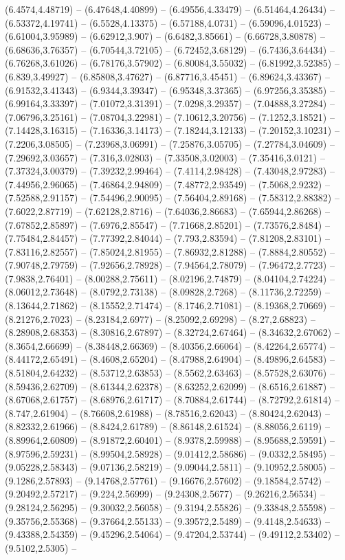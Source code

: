{(6.4574,4.48719) -- (6.47648,4.40899) -- (6.49556,4.33479) -- (6.51464,4.26434) -- (6.53372,4.19741) -- (6.5528,4.13375) -- (6.57188,4.0731) -- (6.59096,4.01523) -- (6.61004,3.95989) -- (6.62912,3.907) -- (6.6482,3.85661) -- (6.66728,3.80878) -- (6.68636,3.76357) -- (6.70544,3.72105) -- (6.72452,3.68129) -- (6.7436,3.64434) -- (6.76268,3.61026) -- (6.78176,3.57902) -- (6.80084,3.55032) -- (6.81992,3.52385) -- (6.839,3.49927) -- (6.85808,3.47627) -- (6.87716,3.45451) -- (6.89624,3.43367) -- (6.91532,3.41343) -- (6.9344,3.39347) -- (6.95348,3.37365) -- (6.97256,3.35385) -- (6.99164,3.33397) -- (7.01072,3.31391) -- (7.0298,3.29357) -- (7.04888,3.27284) -- (7.06796,3.25161) -- (7.08704,3.22981) -- (7.10612,3.20756) -- (7.1252,3.18521) -- (7.14428,3.16315) -- (7.16336,3.14173) -- (7.18244,3.12133) -- (7.20152,3.10231) -- (7.2206,3.08505) -- (7.23968,3.06991) -- (7.25876,3.05705) -- (7.27784,3.04609) -- (7.29692,3.03657) -- (7.316,3.02803) -- (7.33508,3.02003) -- (7.35416,3.0121) -- (7.37324,3.00379) -- (7.39232,2.99464) -- (7.4114,2.98428) -- (7.43048,2.97283) -- (7.44956,2.96065) -- (7.46864,2.94809) -- (7.48772,2.93549) -- (7.5068,2.9232) -- (7.52588,2.91157) -- (7.54496,2.90095) -- (7.56404,2.89168) -- (7.58312,2.88382) -- (7.6022,2.87719) -- (7.62128,2.8716) -- (7.64036,2.86683) -- (7.65944,2.86268) -- (7.67852,2.85897) -- (7.6976,2.85547) -- (7.71668,2.85201) -- (7.73576,2.8484) -- (7.75484,2.84457) -- (7.77392,2.84044) -- (7.793,2.83594) -- (7.81208,2.83101) -- (7.83116,2.82557) -- (7.85024,2.81955) -- (7.86932,2.81288) -- (7.8884,2.80552) -- (7.90748,2.79759) -- (7.92656,2.78928) -- (7.94564,2.78079) -- (7.96472,2.7723) -- (7.9838,2.76401) -- (8.00288,2.75611) -- (8.02196,2.74879) -- (8.04104,2.74224) -- (8.06012,2.73648) -- (8.0792,2.73138) -- (8.09828,2.7268) -- (8.11736,2.72259) -- (8.13644,2.71862) -- (8.15552,2.71474) -- (8.1746,2.71081) -- (8.19368,2.70669) -- (8.21276,2.7023) -- (8.23184,2.6977) -- (8.25092,2.69298) -- (8.27,2.68823) -- (8.28908,2.68353) -- (8.30816,2.67897) -- (8.32724,2.67464) -- (8.34632,2.67062) -- (8.3654,2.66699) -- (8.38448,2.66369) -- (8.40356,2.66064) -- (8.42264,2.65774) -- (8.44172,2.65491) -- (8.4608,2.65204) -- (8.47988,2.64904) -- (8.49896,2.64583) -- (8.51804,2.64232) -- (8.53712,2.63853) -- (8.5562,2.63463) -- (8.57528,2.63076) -- (8.59436,2.62709) -- (8.61344,2.62378) -- (8.63252,2.62099) -- (8.6516,2.61887) -- (8.67068,2.61757) -- (8.68976,2.61717) -- (8.70884,2.61744) -- (8.72792,2.61814) -- (8.747,2.61904) -- (8.76608,2.61988) -- (8.78516,2.62043) -- (8.80424,2.62043) -- (8.82332,2.61966) -- (8.8424,2.61789) -- (8.86148,2.61524) -- (8.88056,2.6119) -- (8.89964,2.60809) -- (8.91872,2.60401) -- (8.9378,2.59988) -- (8.95688,2.59591) -- (8.97596,2.59231) -- (8.99504,2.58928) -- (9.01412,2.58686) -- (9.0332,2.58495) -- (9.05228,2.58343) -- (9.07136,2.58219) -- (9.09044,2.5811) -- (9.10952,2.58005) -- (9.1286,2.57893) -- (9.14768,2.57761) -- (9.16676,2.57602) -- (9.18584,2.5742) -- (9.20492,2.57217) -- (9.224,2.56999) -- (9.24308,2.5677) -- (9.26216,2.56534) -- (9.28124,2.56295) -- (9.30032,2.56058) -- (9.3194,2.55826) -- (9.33848,2.55598) -- (9.35756,2.55368) -- (9.37664,2.55133) -- (9.39572,2.5489) -- (9.4148,2.54633) -- (9.43388,2.54359) -- (9.45296,2.54064) -- (9.47204,2.53744) -- (9.49112,2.53402) -- (9.5102,2.5305) -- }
